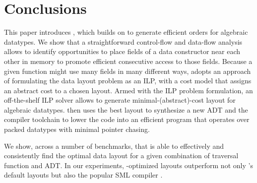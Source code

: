 \section{Conclusions}

This paper introduces \system, which builds on \gibbon to generate efficient orders for algebraic datatypes. We show that a straightforward control-flow and data-flow analysis allows \system to identify opportunities to place fields of a data constructor near each other in memory to promote efficient consecutive access to those fields. Because a given function might use many fields in many different ways, \system adopts an approach of formulating the data layout problem as an ILP, with a cost model that assigns an abstract cost to a chosen layout. Armed with the ILP problem formulation, an off-the-shelf ILP solver allows \system to generate minimal-(abstract)-cost layout for algebraic datatypes. \system then uses the best layout to synthesize a new ADT and the \gibbon compiler toolchain to lower the code into an efficient program that operates over packed datatypes with minimal pointer chasing.

We show, across a number of benchmarks, that \system is able to effectively and consistently find the optimal data layout for a given combination of traversal function and ADT. In our experiments, \system-optimized layouts outperform not only \gibbon's default layouts but also the popular SML compiler \mlton.
